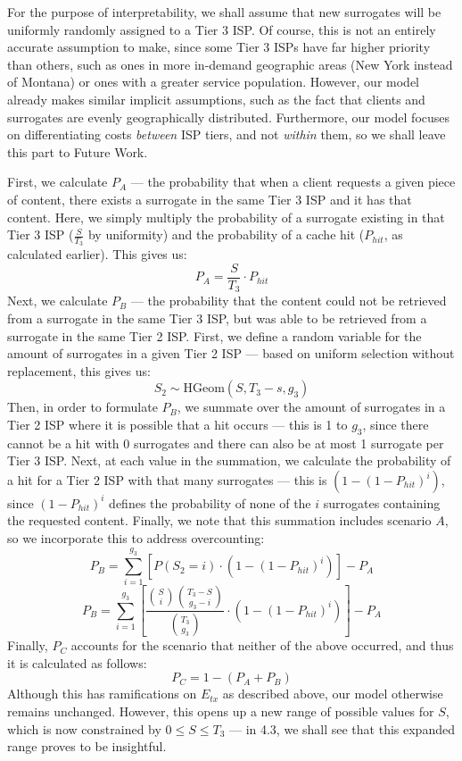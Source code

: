 \documentclass[
	a4paper, %
	10pt, %
	unnumberedsections, %
	twoside, %
]{LTJournalArticle}
\begin{document}
For the purpose of interpretability, we shall assume that new surrogates will be uniformly randomly assigned to a Tier 3 ISP. Of course, this is not an entirely accurate assumption to make, since some Tier 3 ISPs have far higher priority than others, such as ones in more in-demand geographic areas (New York instead of Montana) or ones with a greater service population. However, our model already makes similar implicit assumptions, such as the fact that clients and surrogates are evenly geographically distributed. Furthermore, our model focuses on differentiating costs \textit{between} ISP tiers, and not \textit{within} them, so we shall leave this part to Future Work.

First, we calculate $P_A$ --- the probability that when a client requests a given piece of content, there exists a surrogate in the same Tier 3 ISP and it has that content. Here, we simply multiply the probability of a surrogate existing in that Tier 3 ISP ($\frac{S}{T_3}$ by uniformity) and the probability of a cache hit ($P_{hit}$, as calculated earlier). This gives us:
\[P_A = \frac{S}{T_3} \cdot P_{hit}\]
Next, we calculate $P_B$ --- the probability that the content could not be retrieved from a surrogate in the same Tier 3 ISP, but was able to be retrieved from a surrogate in the same Tier 2 ISP. First, we define a random variable for the amount of surrogates in a given Tier 2 ISP --- based on uniform selection without replacement, this gives us:
\[S_2 \sim \textrm{HGeom}(S, T_3-s, g_3)\]
Then, in order to formulate $P_B$, we summate over the amount of surrogates in a Tier 2 ISP where it is possible that a hit occurs --- this is 1 to $g_3$, since there cannot be a hit with 0 surrogates and there can also be at most 1 surrogate per Tier 3 ISP. Next, at each value in the summation, we calculate the probability of a hit for a Tier 2 ISP with that many surrogates --- this is $(1 - (1 - P_{hit})^i)$, since $(1 - P_{hit})^i$ defines the probability of none of the $i$ surrogates containing the requested content. Finally, we note that this summation includes scenario $A$, so we incorporate this to address overcounting:
\[P_B = \sum^{g_3}_{i=1}[P(S_2 = i) \cdot (1 - (1 - P_{hit})^i)] - P_A\]
\[P_B = \sum^{g_3}_{i=1}\left[\frac{\binom{S}{i}\binom{T_3-S}{g_3 - i}}{\binom{T_3}{g_3}} \cdot (1 - (1 - P_{hit})^i)\right] - P_A\]
Finally, $P_C$ accounts for the scenario that neither of the above occurred, and thus it is calculated as follows:
\[ P_C = 1 - (P_A + P_B)\]
Although this has ramifications on $E_{tx}$ as described above, our model otherwise remains unchanged. However, this opens up a new range of possible values for $S$, which is now constrained by $0 \leq S \leq T_3$ --- in 4.3, we shall see that this expanded range proves to be insightful.
\end{document}

